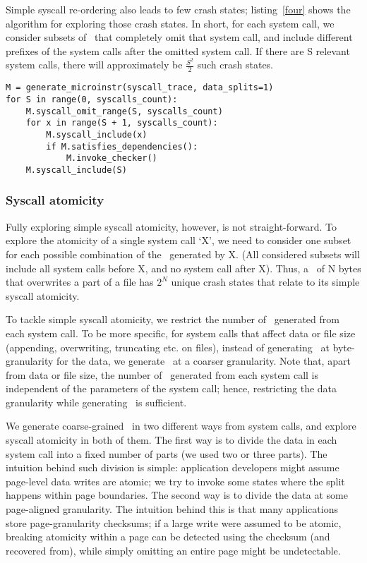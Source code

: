 Simple syscall re-ordering also leads to few crash states; listing~\ref{four} shows the algorithm for exploring those crash states. In short, for each system call, we consider subsets of \microinstructions\ that completely omit that system call, and include different prefixes of the system calls after the omitted system call. If there are S relevant system calls, there will approximately be $\frac{S^2}{2}$ such crash states.

\begin{lstlisting}[float=t, caption = {\textbf{Algorithm for simple syscall re-ordering.}}, label = {four}, escapechar=!]
M = generate_microinstr(syscall_trace, data_splits=1)
for S in range(0, syscalls_count):
    M.syscall_omit_range(S, syscalls_count)
    for x in range(S + 1, syscalls_count):
        M.syscall_include(x)
        if M.satisfies_dependencies():
            M.invoke_checker()
    M.syscall_include(S)
\end{lstlisting}


\subsubsection{Syscall atomicity}

Fully exploring simple syscall atomicity, however, is not straight-forward. To explore the atomicity of a single system call `X', we need to consider one subset for each possible combination of the \microinstructions\ generated by X. (All considered subsets will include all system calls before X, and no system call after X). Thus, a \writeSC\ of N bytes that overwrites a part of a file has $2^N$ unique crash states that relate to its simple syscall atomicity.

To tackle simple syscall atomicity, we restrict the number of \microinstructions\ generated from each system call. To be more specific, for system calls that affect data or file size (appending, overwriting, truncating etc. on files), instead of generating \microinstruction\ at byte-granularity for the data, we generate \microinstructions\ at a coarser granularity. Note that, apart from data or file size, the number of \microinstructions\ generated from each system call is independent of the parameters of the system call; hence, restricting the data granularity while generating \microinstructions\ is sufficient.

We generate coarse-grained \microinstructions\ in two different ways from system calls, and explore syscall atomicity in both of them. The first way is to divide the data in each system call into a fixed number of parts (we used two or three parts). The intuition behind such division is simple: application developers might assume page-level data writes are atomic; we try to invoke some states where the split happens within page boundaries. The second way is to divide the data at some page-aligned granularity. The intuition behind this is that many applications store page-granularity checksums; if a large write were assumed to be atomic, breaking atomicity within a page can be detected using the checksum (and recovered from), while simply omitting an entire page might be undetectable.

